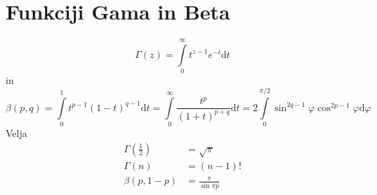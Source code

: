 \documentclass[a4paper,12pt]{article}
\def\dif{\mathrm{d}}
\begin{document}
\section{Funkciji Gama in Beta}
$$
\Gamma(z) = \int\limits_0^\infty t^{z-1} e^{-t}\dif t
$$
%
in
%
$$\beta (p, q) = \int\limits_0^1 t^{p-1} (1-t)^{q-1} \dif t 
= \int\limits_0^\infty \frac{t^p}{(1+t)^{p+q}} \dif t
= 2 \int\limits_0^{\pi /2} \sin^{2q-1}\varphi \cos ^{2p-1} \varphi \dif \varphi
$$
Velja
\begin{align*}
    \Gamma\left( \frac{1}{2} \right)  &= \sqrt{\pi}\\    
    \Gamma(n) &= (n-1)!\\
    \beta (p, 1-p) &= \frac{\pi}{\sin \pi p}
\end{align*}
\end{document}
